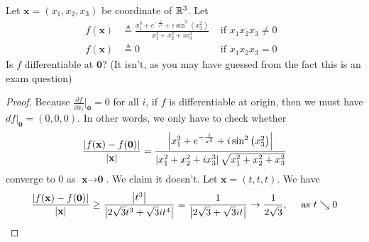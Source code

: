 \documentclass{report}
\begin{document}
\begin{question}{}{}
Let $\textbf{x}=(x_1,x_2,x_3)$ be coordinate of $\mathbb{R}^3$. Let 
\begin{align*}
  f(\textbf{x})&\triangleq  \frac{x_1^3+e^{-\frac{1}{x^2}}+i \sin^2 \left( x_3^2 \right)}{x_1^2+x_2^2+i x_3^3 } &\text{ if $x_1x_2x_3\neq 0$ }\\
  f(\textbf{x})&\triangleq  0  &\text{ if }x_1x_2x_3=0
\end{align*}
Is $f$ differentiable at $\textbf{0}$? (It isn't, as you may have guessed from the fact this is an exam question) 
\end{question}
\begin{proof}
Because $\frac{\partial f}{\partial x_i}\big|_{\textbf{0}}=0$ for all $i$, if $f$ is differentiable at origin, then we must have $df|_\textbf{0}= (0,0,0)$. In other words, we only have to check whether
\begin{align*}
   \frac{\left|f(\textbf{x})- f(\textbf{0})\right|}{\left|\textbf{x}\right|}=\frac{\left|x_1^3 + e^{-\frac{1}{x^2}}+ i \sin^2 \left(x_3^2 \right)\right|}{\left|x_1^2+x_2^2+i x_3^3 \right| \sqrt{x_1^2+x_2^2+x_3^2} }
\end{align*}
converge to $0$ as  $\textbf{x}\rightarrow \textbf{0}$. We claim it doesn't. Let $\textbf{x}=(t,t,t)$. We have 
\begin{align*}
  \frac{\left|f(\textbf{x})- f(\textbf{0})\right|}{\left|\textbf{x}\right|}\geq  \frac{\left|t^3\right|}{ \left|2\sqrt{3}t^3+\sqrt{3} it^4\right| } = \frac{1}{\left|2\sqrt{3} + \sqrt{3}it\right|} \rightarrow \frac{1}{2\sqrt{3}},\quad \text{ as }t \searrow 0
\end{align*}
\end{proof}
\end{document}
